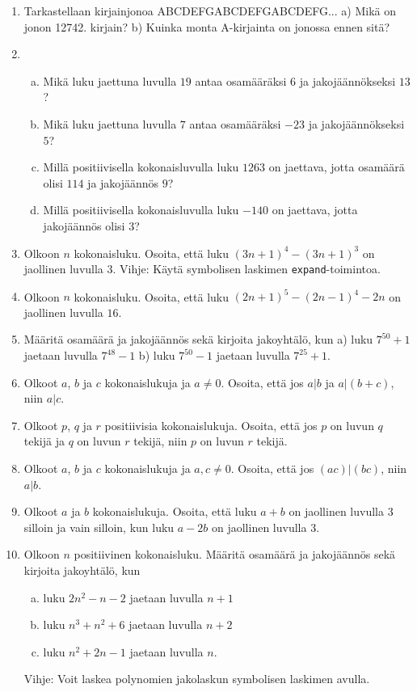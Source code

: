 \begin{enumerate}
\item Tarkastellaan kirjainjonoa ABCDEFGABCDEFGABCDEFG... a) Mikä on jonon 12742. kirjain? b) Kuinka monta A-kirjainta on jonossa ennen sitä?

\item 
\begin{enumerate}[a)]
\item Mikä luku jaettuna luvulla $19$ antaa osamääräksi $6$ ja jakojäännökseksi $13$?
\item Mikä luku jaettuna luvulla $7$ antaa osamääräksi $-23$ ja jakojäännökseksi $5$?
\item Millä positiivisella kokonaisluvulla luku $1263$ on jaettava, jotta osamäärä olisi $114$ ja jakojäännös $9$?
\item  Millä positiivisella kokonaisluvulla luku $-140$ on jaettava, jotta jakojäännös olisi $3$?
\end{enumerate}

\item Olkoon $n$ kokonaisluku. Osoita, että luku $(3n+1)^4 - (3n+1)^3$ on jaollinen luvulla 3. Vihje: Käytä symbolisen laskimen {\tt expand}-toimintoa.

\item Olkoon $n$ kokonaisluku. Osoita, että luku $(2n+1)^5 - (2n-1)^4-2n$ on jaollinen luvulla $16$.

\item Määritä osamäärä ja jakojäännös sekä kirjoita jakoyhtälö, kun a) luku $7^{50} + 1$ jaetaan luvulla $7^{48} - 1$ b) luku $7^{50} - 1$ jaetaan luvulla $7^{25} + 1$.

\item Olkoot $a$, $b$ ja $c$ kokonaislukuja ja $a \neq 0$. Osoita, että jos $a|b$ ja $a|(b + c)$, niin $a|c$.

\item Olkoot $p$, $q$ ja $r$ positiivisia kokonaislukuja. Osoita, että jos $p$ on luvun $q$ tekijä ja $q$ on luvun $r$ tekijä, niin $p$ on luvun $r$ tekijä.

\item Olkoot $a$, $b$ ja $c$ kokonaislukuja ja $a,c \neq 0$. Osoita, että jos $(ac)|(bc)$, niin $a|b$.

\item Olkoot $a$ ja $b$ kokonaislukuja. Osoita, että luku $a + b$ on jaollinen luvulla $3$ silloin ja vain silloin, kun luku $a - 2b$ on jaollinen luvulla $3$.

\item Olkoon $n$ positiivinen kokonaisluku. Määritä osamäärä ja jakojäännös sekä kirjoita jakoyhtälö, kun
\begin{enumerate}[a)]
\item luku $2n^2 - n - 2$ jaetaan luvulla $n + 1$
\item luku $n^3 + n^2 + 6$ jaetaan luvulla $n + 2$
\item luku $n^2 + 2n - 1$ jaetaan luvulla $n$.
\end{enumerate}
Vihje: Voit laskea polynomien jakolaskun symbolisen laskimen avulla.


\end{enumerate}

